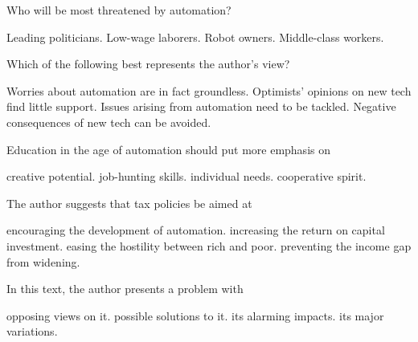 \item Who will be most threatened by automation?
\begin{tasks}
	\task Leading politicians.
	\task Low-wage laborers.
	\task Robot owners.
	\task Middle-class workers.
\end{tasks}
\item Which of the following best represents the author's view?
\begin{tasks}
	\task Worries about automation are in fact groundless.
	\task Optimists' opinions on new tech find little support.
	\task Issues arising from automation need to be tackled.
	\task Negative consequences of new tech can be avoided.
\end{tasks}
\item Education in the age of automation should put more emphasis on
\begin{tasks}
	\task creative potential.
	\task job-hunting skills.
	\task individual needs.
	\task cooperative spirit.
\end{tasks}
\item The author suggests that tax policies be aimed at
\begin{tasks}
	\task encouraging the development of automation.
	\task increasing the return on capital investment.
	\task easing the hostility between rich and poor.
	\task preventing the income gap from widening.
\end{tasks}
\item In this text, the author presents a problem with
\begin{tasks}
	\task opposing views on it.
	\task possible solutions to it.
	\task its alarming impacts.
	\task its major variations.
\end{tasks}
